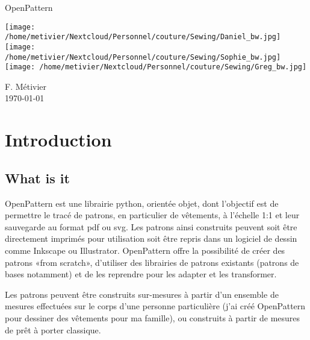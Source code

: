 \documentclass[10pt,a4paper,twoside]{report}
\begin{document}
\begin{titlepage}
\vspace*{5cm}
\begin{flushright}
{\Huge\sf OpenPattern}
\vspace*{1cm}

\begin{center}
\texttt{[image: /home/metivier/Nextcloud/Personnel/couture/Sewing/Daniel\_bw.jpg]}
\texttt{[image: /home/metivier/Nextcloud/Personnel/couture/Sewing/Sophie\_bw.jpg]}
\texttt{[image: /home/metivier/Nextcloud/Personnel/couture/Sewing/Greg\_bw.jpg]}
\end{center}

\vspace*{1cm}
{\Large\sf F. Métivier}\\
\vspace*{1cm}
{\sf\today}
\end{flushright}


\end{titlepage}
\pagestyle{headings}
\tableofcontents


\chapter{Introduction}

\section{What is it}
OpenPattern  est une librairie python, orientée objet,  dont l'objectif est de permettre le tracé de patrons, en particulier de vêtements, à l'échelle 1:1 et leur sauvegarde au format pdf ou svg. Les patrons ainsi construits peuvent soit être directement imprimés pour utilisation soit être repris dans un logiciel de dessin comme Inkscape ou Illustrator.
OpenPattern offre la possibilité de créer des patrons «from scratch», d'utiliser des librairies de patrons existants (patrons de bases notamment) et de les reprendre pour les adapter et les transformer.

Les patrons peuvent être construits sur-mesures à partir d'un ensemble de mesures effectuées sur le corps d'une personne particulière (j'ai créé OpenPattern pour dessiner des vêtements pour ma famille), ou construits à partir de mesures de prêt à porter classique.
\end{document}
